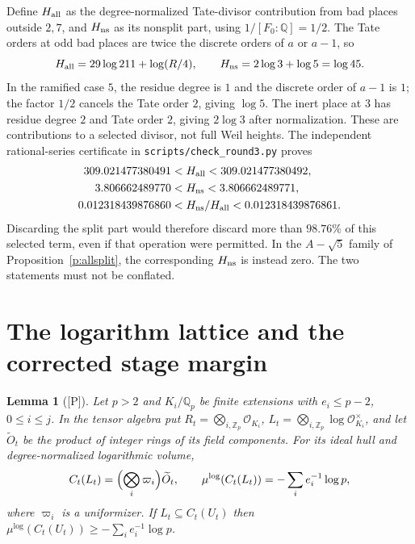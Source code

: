 \documentclass[11pt]{article}
\theoremstyle{plain}
\newtheorem{lemma}[proposition]{Lemma}
\theoremstyle{definition}
\begin{document}
Define $H_{\rm all}$ as the degree-normalized Tate-divisor contribution from
bad places outside $2,7$, and $H_{\rm ns}$ as its nonsplit part, using
$1/[F_0:\mathbb Q]=1/2$.  The Tate orders at odd bad places are twice the
discrete orders of $a$ or $a-1$, so
\begin{equation}\label{e:heightcost}
 H_{\rm all}=29\log211+\log(R/4),\qquad H_{\rm ns}=2\log3+\log5=\log45.
\end{equation}
In the ramified case $5$, the residue degree is $1$ and the discrete order of
$a-1$ is $1$; the factor $1/2$ cancels the Tate order $2$, giving $\log5$.
The inert place at $3$ has residue degree $2$ and Tate order $2$, giving
$2\log3$ after normalization.  These are contributions to a selected divisor,
not full Weil heights.
The independent rational-series certificate in
\texttt{scripts/check\_round3.py} proves
\[
\begin{split}
309.021477380491&<H_{\rm all}<309.021477380492,\\
3.806662489770&<H_{\rm ns}<3.806662489771,\\
0.012318439876860&<H_{\rm ns}/H_{\rm all}<0.012318439876861.
\end{split}
\]
Discarding the split part would therefore discard more than $98.76\%$ of
this selected term, even if that operation were permitted.  In the
$A-\sqrt5$ family of Proposition~\ref{p:allsplit}, the corresponding
$H_{\rm ns}$ is instead zero.  The two statements must not be conflated.


\section{The logarithm lattice and the corrected stage margin}\label{s:hull}

\begin{lemma}[\textup{[P]}]\label{l:hull}
Let $p>2$ and $K_i/\mathbb Q_p$ be finite extensions with $e_i\le p-2$,
$0\le i\le j$.  In the tensor algebra put
$R_t=\bigotimes_{i,\mathbb Z_p}\mathcal O_{K_i}$,
$L_t=\bigotimes_{i,\mathbb Z_p}\log\mathcal O_{K_i}^\times$, and let
$\widetilde O_t$ be the product of integer rings of its field components.
For its ideal hull and degree-normalized logarithmic volume,
\[
 C_t(L_t)=\Bigl(\bigotimes_i\varpi_i\Bigr)\widetilde O_t,
 \qquad \mu^{\log}(C_t(L_t))=-\sum_i e_i^{-1}\log p,
\]
where $\varpi_i$ is a uniformizer.  If $L_t\subseteq C_t(U_t)$ then
$\mu^{\log}(C_t(U_t))\ge-\sum_i e_i^{-1}\log p$.
\end{lemma}
\end{document}
